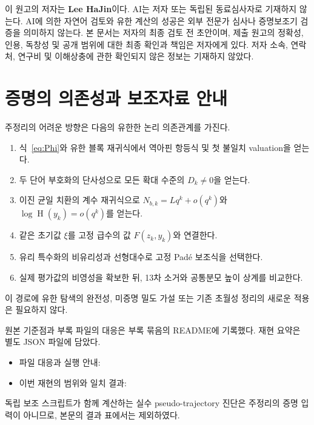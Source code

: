 \documentclass[11pt,a4paper]{article}
\theoremstyle{koreanplain}
\newcommand{\htQ}{\operatorname{H}}
\begin{document}
이 원고의 저자는 \textbf{Lee HaJin}이다. AI는 저자 또는 독립된 동료심사자로 기재하지 않는다. AI에 의한 자연어 검토와 유한 계산의 성공은 외부 전문가 심사나 증명보조기 검증을 의미하지 않는다. 본 문서는 저자의 최종 검토 전 초안이며, 제출 원고의 정확성, 인용, 독창성 및 공개 범위에 대한 최종 확인과 책임은 저자에게 있다. 저자 소속, 연락처, 연구비 및 이해상충에 관한 확인되지 않은 정보는 기재하지 않았다.

\appendix
\section{증명의 의존성과 보조자료 안내}

주정리의 어려운 방향은 다음의 유한한 논리 의존관계를 가진다.
\begin{enumerate}[leftmargin=2em]
\item 식~\eqref{eq:Phi}와 유한 블록 재귀식에서 역아핀 항등식 및 첫 불일치 valuation을 얻는다.
\item 두 단어 부호화의 단사성으로 모든 확대 수준의 $D_k\ne0$을 얻는다.
\item 이진 균일 치환의 계수 재귀식으로 $N_{b,k}=Lq^k+o(q^k)$와 $\log\htQ(y_k)=o(q^k)$를 얻는다.
\item 같은 초기값 $\xi$를 고정 급수의 값 $F(z_k,y_k)$와 연결한다.
\item 유리 특수화의 비유리성과 선형대수로 고정 Padé 보조식을 선택한다.
\item 실제 평가값의 비영성을 확보한 뒤, 13차 소거와 공통분모 높이 상계를 비교한다.
\end{enumerate}
이 경로에 유한 탐색의 완전성, 미증명 밀도 가설 또는 기존 초월성 정리의 새로운 적용은 필요하지 않다.

원본 기준점과 부록 파일의 대응은 부록 묶음의 README에 기록했다. 재현 요약은 별도 JSON 파일에 담았다.
\begin{itemize}[leftmargin=2em]
\item 파일 대응과 실행 안내: 
\item 이번 재현의 범위와 일치 결과: 
\end{itemize}
독립 보조 스크립트가 함께 계산하는 실수 pseudo-trajectory 진단은 주정리의 증명 입력이 아니므로, 본문의 결과 표에서는 제외하였다.
\end{document}
